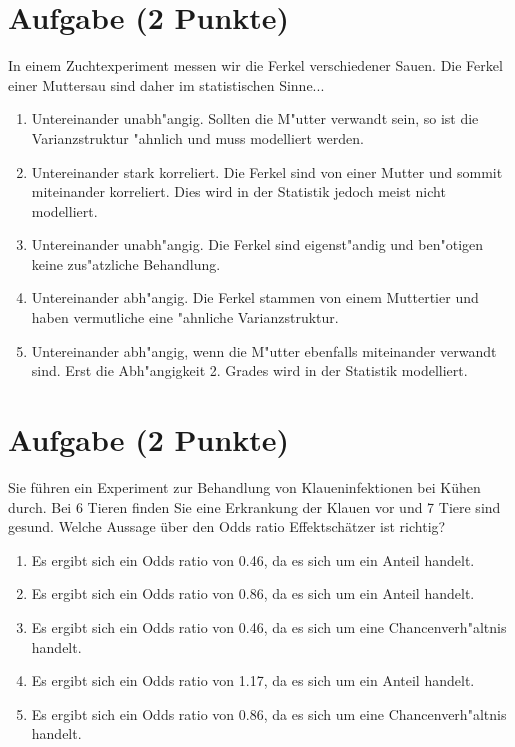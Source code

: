 \documentclass[a4paper, 9pt]{scrartcl}\usepackage[]{graphicx}\usepackage[]{xcolor}
\begin{document}
\section{Aufgabe \hfill (2 Punkte)}

In einem Zuchtexperiment messen wir die Ferkel verschiedener Sauen. Die
Ferkel einer Muttersau sind daher im statistischen Sinne... 



\begin{enumerate}
\item [\textbf{A} \msquare] Untereinander unabh{"a}ngig. Sollten die M{"u}tter verwandt sein, so ist die Varianzstruktur {"a}hnlich und muss modelliert werden.
\item [\textbf{B} \msquare] Untereinander stark korreliert. Die Ferkel sind von einer Mutter und sommit miteinander korreliert. Dies wird in der Statistik jedoch meist nicht modelliert.
\item [\textbf{C} \msquare] Untereinander unabh{"a}ngig. Die Ferkel sind eigenst{"a}ndig und ben{"o}tigen keine zus{"a}tzliche Behandlung.
\item [\textbf{D} \msquare] Untereinander abh{"a}ngig. Die Ferkel stammen von einem Muttertier und haben vermutliche eine {"a}hnliche Varianzstruktur.
\item [\textbf{E} \msquare] Untereinander abh{"a}ngig, wenn die M{"u}tter ebenfalls miteinander verwandt sind. Erst die Abh{"a}ngigkeit 2. Grades wird in der Statistik modelliert.
\end{enumerate}

\section{Aufgabe \hfill (2 Punkte)}



Sie f{\"u}hren ein Experiment zur Behandlung von Klaueninfektionen bei K{\"u}hen
durch. Bei 6 Tieren finden Sie eine Erkrankung der Klauen vor und
7 Tiere sind gesund. Welche Aussage {\"u}ber den Odds ratio
Effektsch{\"a}tzer ist richtig?



\begin{enumerate}
\item [\textbf{A} \msquare] Es ergibt sich ein Odds ratio von 0.46, da es sich um ein Anteil handelt.
\item [\textbf{B} \msquare] Es ergibt sich ein Odds ratio von 0.86, da es sich um ein Anteil handelt.
\item [\textbf{C} \msquare] Es ergibt sich ein Odds ratio von 0.46, da es sich um eine Chancenverh{"a}ltnis handelt.
\item [\textbf{D} \msquare] Es ergibt sich ein Odds ratio von 1.17, da es sich um ein Anteil handelt.
\item [\textbf{E} \msquare] Es ergibt sich ein Odds ratio von 0.86, da es sich um eine Chancenverh{"a}ltnis handelt.
\end{enumerate}
\end{document}
